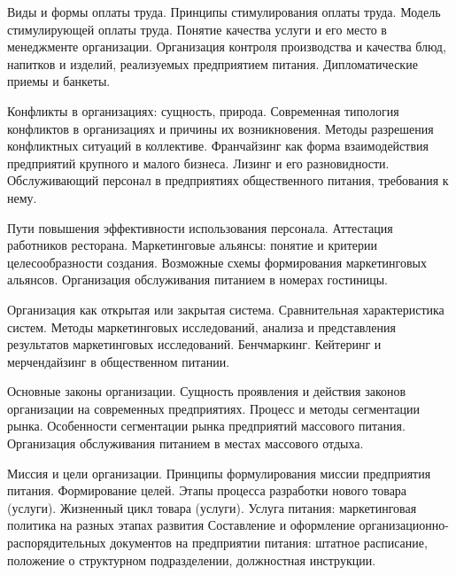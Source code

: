 \documentclass[
	11pt,
	a4paper,
	]
	{article}
\begin{document}
\bigskip

\noindent{} 
	{
		Виды и формы оплаты труда. Принципы стимулирования оплаты труда. Модель стимулирующей оплаты труда.
	}{
		Понятие качества услуги и его место в менеджменте организации. Организация контроля производства и качества блюд, напитков и изделий, реализуемых предприятием питания.
	}{
		Дипломатические приемы и банкеты.
	}

\bigskip

\noindent{} 
	{
		Конфликты в организациях: сущность, природа. Современная типология конфликтов в организациях и причины их возникновения. Методы разрешения конфликтных ситуаций в коллективе.
	}{
		Франчайзинг как форма взаимодействия предприятий крупного и малого бизнеса. Лизинг и его разновидности.
	}{
		Обслуживающий персонал в предприятиях общественного питания, требования к нему.
	}

\bigskip

\noindent{} 
	{
		Пути повышения эффективности использования персонала. Аттестация работников ресторана.
	}{
		Маркетинговые альянсы: понятие и критерии целесообразности создания. Возможные схемы формирования маркетинговых альянсов.
	}{
		Организация обслуживания питанием в номерах гостиницы.
	}

\bigskip

\noindent{} 
	{
		Организация как открытая или закрытая система. Сравнительная характеристика систем.
	}{
		Методы маркетинговых исследований, анализа и представления результатов маркетинговых исследований. Бенчмаркинг.
	}{
		Кейтеринг и мерчендайзинг в общественном питании.
	}

\bigskip

\noindent{} 
	{
		Основные законы организации. Сущность проявления и действия законов организации на современных предприятиях.
	}{
		Процесс и методы сегментации рынка. Особенности сегментации рынка предприятий массового питания.
	}{
		Организация обслуживания питанием в местах массового отдыха.
	}

\bigskip

\noindent{} 
	{
		Миссия и цели организации. Принципы формулирования миссии предприятия питания. Формирование целей.
	}{
		Этапы процесса разработки нового товара (услуги). Жизненный цикл товара (услуги). Услуга питания: маркетинговая политика на разных этапах развития
	}{
		Составление и оформление организационно-распорядительных документов на предприятии питания: штатное расписание, положение о структурном подразделении, должностная инструкции.
	}
\end{document}
